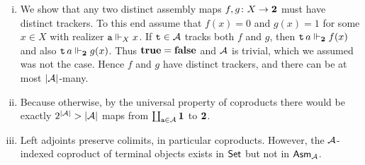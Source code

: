 \begin{enumerate}[(i)]
  \item
    We show that any two distinct assembly maps
    \(f, g \colon X \to \Two\)
    must have distinct trackers.
    To this end assume that \(f(x) = 0\) and \(g(x) = 1\) for some \(x \in X\)
    with realizer \(\pca a \realizes_X x\).
    If \(\pca t \in \AA\) tracks both \(f\) and \(g\), then
    \(\pca{t} a \realizes_{\Two} f(x)\) and also
    \(\pca{t} a \realizes_{\Two} g(x)\).
    Thus \(\pcatrue = \pcafalse\) and \(\AA\) is trivial, which we assumed
    was not the case.
    Hence \(f\) and \(g\) have distinct trackers, and there can be at most
    \(\carrier{\AA}\)-many.

  \item
    Because otherwise, by the universal property of coproducts there would be
    exactly \(2^{\carrier{\AA}} > \carrier{\AA}\) maps from
    \(\coprod_{\pca{a} \in \AA} \One\) to \(\Two\).

  \item
    Left adjoints preserve colimits, in particular coproducts.
    However, the \(\AA\)-indexed coproduct of terminal objects exists in
    \(\Set\) but not in \(\Asm\AA\).
\end{enumerate}






